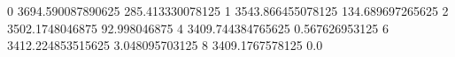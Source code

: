 0 3694.590087890625 285.413330078125
1 3543.866455078125 134.689697265625
2 3502.1748046875 92.998046875
4 3409.744384765625 0.567626953125
6 3412.224853515625 3.048095703125
8 3409.1767578125 0.0
